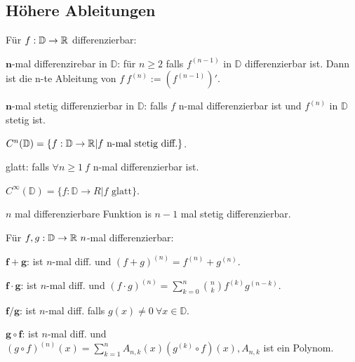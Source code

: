 \subsection{Höhere Ableitungen}
Für $f: \mathbb{D} \to \mathbb{R}$ differenzierbar:
\begin{compactdesc}
    \item[$\mathbf{n}$-mal differenzirebar in $\mathbb{D}$:] für $n\ge 2$ falls $f^{(n-1)}$ in $\mathbb{D}$ differenzierbar ist. Dann ist die n-te Ableitung von $f \ f^{(n)} := (f^{(n-1)})'$.
    \item[$\mathbf{n}$-mal stetig differenzierbar in $\mathbb{D}$:] falls $f$ n-mal differenzierbar ist und $f^{(n)}$ in $\mathbb{D}$ stetig ist.
        \begin{compactitem}
            \item $C^n(\mathbb{D}) = \{f:\mathbb{D} \to \mathbb{R} | f \text{ n-mal stetig diff.}\}$.
        \end{compactitem}
    \item[glatt:] falls $\forall n \ge 1 \ f$ n-mal differenzierbar ist.
        \begin{compactitem}
        \item $C^\infty(\mathbb{D}) = \{f:\mathbb{D} \to R | f \text{ glatt}\}$.
        \end{compactitem}
\end{compactdesc}
\begin{compactitem}
    \item $n$ mal differenzierbare Funktion is $n-1$ mal stetig differenzierbar.
\end{compactitem}
Für $f,g: \mathbb{D} \to \mathbb{R} \ n$-mal differenzierbar:
\begin{compactdesc}
    \item[$\mathbf{f + g}$:] ist $n$-mal diff. und $(f + g)^{(n)} = f^{(n)} + g^{(n)}$.
    \item[$\mathbf{f \cdot g}$:] ist $n$-mal diff. und $(f \cdot g)^{(n)} = \sum_{k=0}^{n} \binom{n}{k}f^{(k)} g^{(n-k)}$.
    \item[$\mathbf{f / g}$:] ist $n$-mal diff. falls $g(x) \neq 0 \ \forall x \in \mathbb{D}$.
    \item[$\mathbf{g \circ f}$:] ist $n$-mal diff. und $(g \circ f)^{(n)}(x) =  \sum_{k=1}^{n} A_{n,k}(x)\left( g^{(k)} \circ f \right) (x), A_{n,k}$ ist ein Polynom.
\end{compactdesc}

